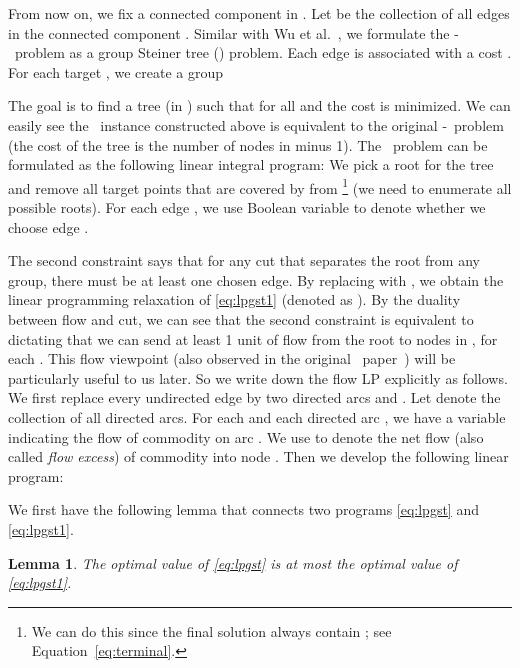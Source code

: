\documentclass[11pt]{article}
\newcommand{\mincsc}{-}
\newcommand{\gst}{}
\newtheorem{lemma}{Lemma}
\begin{document}
From now on, we fix a connected component  in . Let  be the collection of all edges in the connected component .
Similar with Wu et al.~\cite{wu2013approximations},
we formulate the \mincsc\ problem as a group Steiner tree (\gst) problem.
Each edge  is associated with a cost .
For each target , we create a group

The goal is to find a tree  (in ) such that
 for all 
and the cost is minimized.
We can easily see the \gst\ instance constructed above is equivalent to
the original \mincsc\ problem
(the cost of the tree  is the number of nodes in  minus 1).
The \gst\ problem can be formulated as the following linear integral program:
We pick a root  for the tree  and remove all target points that are covered by  from \footnote{We can do this since the final solution always contain ; see Equation~\eqref{eq:terminal}.}
(we need to enumerate all possible roots).
For each edge , we use Boolean variable 
to denote whether we choose edge .



The second constraint says that for any cut  that separates the root
 from any group, there must be at least one chosen edge.
By replacing  with , we obtain the linear programming relaxation of \ref{eq:lpgst1} (denoted as ).
By the duality between flow and cut, we can see that
the second constraint is equivalent to dictating that
we can send at least 1 unit of flow from the root  to nodes in , for each .
This flow viewpoint (also observed in the original \gst\ paper~\cite{garg1998polylogarithmic})
will be particularly useful to us later.
So we write down the flow LP explicitly as follows.
We first replace every undirected edge 
by two directed arcs  and .
Let  denote the collection of all directed arcs.
For each  and
each directed arc , we have a variable  indicating the flow of commodity  on arc .
We use  to denote the net flow
(also called {\em flow excess}) of commodity  into node .
Then we develop the following linear program:



We first have the following lemma that connects two programs \ref{eq:lpgst} and \ref{eq:lpgst1}.


\begin{lemma}
	\label{lm:optimal}
	The optimal value of \ref{eq:lpgst} is at most the optimal value of \ref{eq:lpgst1}.
\end{lemma}
\end{document}
